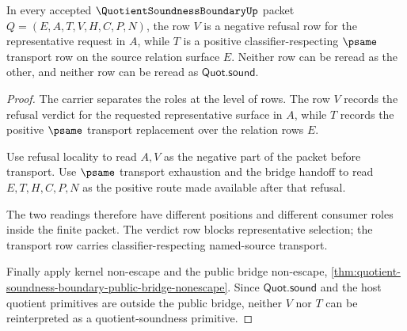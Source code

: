 \begin{theorem}
\label{thm:quotient-soundness-boundary-verdict-transport-separation}
In every accepted $\QuotientSoundnessBoundaryUp$ packet $Q=(E,A,T,V,H,C,P,N)$, the row $V$ is a negative refusal row for the representative request in $A$, while $T$ is a positive classifier-respecting $\psame$ transport row on the source relation surface $E$. Neither row can be reread as the other, and neither row can be reread as $\mathsf{Quot.sound}$.
\end{theorem}
\begin{proof}
The carrier separates the roles at the level of rows. The row $V$ records the refusal verdict for the requested representative surface in $A$, while $T$ records the positive $\psame$ transport replacement over the relation rows $E$.

Use refusal locality to read $A,V$ as the negative part of the packet before transport. Use $\psame$ transport exhaustion and the bridge handoff to read $E,T,H,C,P,N$ as the positive route made available after that refusal.

The two readings therefore have different positions and different consumer roles inside the finite packet. The verdict row blocks representative selection; the transport row carries classifier-respecting named-source transport.

Finally apply kernel non-escape and the public bridge non-escape, \autoref{thm:quotient-soundness-boundary-public-bridge-nonescape}. Since $\mathsf{Quot.sound}$ and the host quotient primitives are outside the public bridge, neither $V$ nor $T$ can be reinterpreted as a quotient-soundness primitive.
\end{proof}
